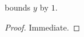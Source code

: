 
\begin{proposition}\label{prop:cross}
 bounds $y$ by $1$.
\end{proposition}

\begin{proof}
Immediate.
\end{proof}
